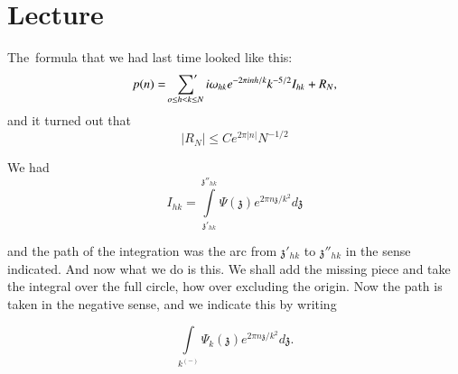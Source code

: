 \chapter{Lecture}\label{part3:lec18} %

The\pageoriginale\ formula that we had last time looked like this:
$$
p(n) = \sideset{}{'}\sum_{o \leq h < k \leq N} i \omega_{hk} e^{- 2 \pi in h/k}
k^{- 5/2} I_{hk}+ R_N,
$$
and it turned out that
$$
|R_N| \leq C e^{2 \pi|n|} N^{- 1/2}
$$

We had
$$
I_{hk} = \int\limits^{\mathfrak{z}''_{hk}}_{\mathfrak{z}'_{hk}} \Psi
(\mathfrak{z}) e^{2 \pi n \mathfrak{z}/k^2} d\mathfrak{z}
$$

\medskip
\noindent
\begin{minipage}[c]{4.5cm} 
  and the path of the integration was the arc from $\mathfrak{z}'_{hk}$
  to $\mathfrak{z}''_{hk}$ in the sense indicated. And now what we do is
  this. We shall add the missing piece and take the integral over the
  full circle, how over excluding the origin. Now the path is taken in
  the negative sense, and we indicate this by writing
\end{minipage}
\begin{minipage}[c]{5.5cm}
\begin{figure}[H]
\end{figure}
\end{minipage}
$$
\int\limits_{k^{(-)}} \Psi_k (\mathfrak{z}) e^{2 \pi n
  \mathfrak{z}/k^2} d\mathfrak{z}.
$$

